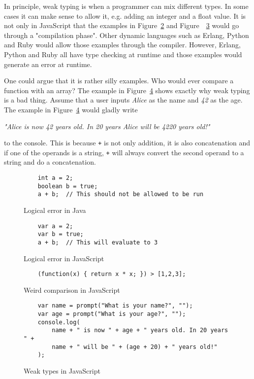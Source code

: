 In principle, weak typing is when a programmer can mix different types. In some cases it can make sense to allow it, e.g. adding an integer and a float value. It is not only in JavaScript that the examples in Figure~\ref{fig:error_js} and Figure~~\ref{fig:js_comparison} would go through a "compilation phase". Other dynamic languages such as Erlang, Python and Ruby would allow those examples through the compiler. However, Erlang, Python and Ruby all have type checking at runtime and those examples would generate an error at runtime.

One could argue that it is rather silly examples. Who would ever compare a function with an array? The example in Figure~\ref{fig:js_bad_age} shows exactly why weak typing is a bad thing. Assume that a user inputs \emph{Alice} as the name and \emph{42} as the age. The example in Figure~\ref{fig:js_bad_age} would gladly write
\begin{center}
  \emph{"Alice is now 42 years old. In 20 years Alice will be 4220 years old!"}
\end{center}
to the console. This is because {\tt +} is not only addition, it is also concatenation and if one of the operands is a string, {\tt +} will always convert the second operand to a string and do a concatenation.

\begin{figure}[h]
  \begin{verbatim}
    int a = 2;
    boolean b = true;
    a + b;  // This should not be allowed to be run
  \end{verbatim}
  \caption{Logical error in Java}
  \label{fig:error_java}
\end{figure}
\begin{figure}[h]
  \begin{verbatim}
    var a = 2;
    var b = true;
    a + b;  // This will evaluate to 3
  \end{verbatim}
  \caption{Logical error in JavaScript}
  \label{fig:error_js}
\end{figure}
\begin{figure}[h]
  \begin{verbatim}
    (function(x) { return x * x; }) > [1,2,3];
  \end{verbatim}
  \caption{Weird comparison in JavaScript}
  \label{fig:js_comparison}
\end{figure}
\begin{figure}[h]
  \begin{verbatim}
    var name = prompt("What is your name?", "");
    var age = prompt("What is your age?", "");
    console.log(
        name + " is now " + age + " years old. In 20 years " +
        name + " will be " + (age + 20) + " years old!"
    );
  \end{verbatim}
  \caption{Weak types in JavaScript}
  \label{fig:js_bad_age}
\end{figure}

